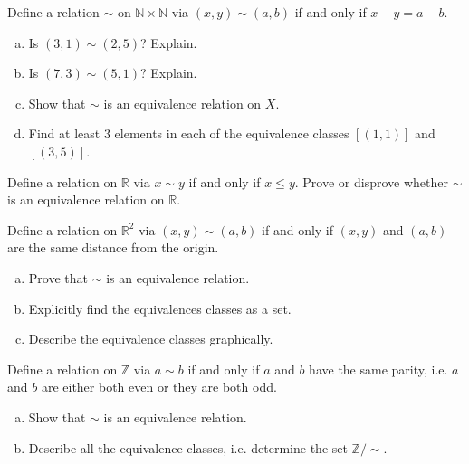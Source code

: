 \documentclass[11pt,letterpaper]{article}
\begin{document}
\homework{}

 Define a relation $\sim$ on $\mathbb{N} \times \mathbb{N}$ via $(x, y) \sim (a, b)$ if and only if $x - y= a - b$.  
        \begin{enumerate}[(a)]
        \item Is $(3, 1) \sim (2, 5)$? Explain.
        \item Is $(7, 3) \sim (5, 1)$? Explain. 
        \item Show that $\sim$ is an equivalence relation on $X$.
        \item Find at least 3 elements in each of the equivalence classes $[(1, 1)]$ and $[(3, 5)]$. 
        \end{enumerate} \pspace





\newpage





  Define a relation on $\mathbb{R}$ via $x \sim y$ if and only if $x \leq y$. Prove or disprove whether $\sim$ is an equivalence relation on $\mathbb{R}$. \pspace





\newpage





 Define a relation on $\mathbb{R}^2$ via $(x, y) \sim (a, b)$ if and only if $(x, y)$ and $(a, b)$ are the same distance from the origin. 
	\begin{enumerate}[(a)]
	\item Prove that $\sim$ is an equivalence relation.
	\item Explicitly find the equivalences classes as a set. 
	\item Describe the equivalence classes graphically. 
	\end{enumerate}





\newpage





 Define a relation on $\mathbb{Z}$ via $a \sim b$ if and only if $a$ and $b$ have the same parity, i.e. $a$ and $b$ are either both even or they are both odd. 
        \begin{enumerate}[(a)]
        \item Show that $\sim$ is an equivalence relation. 
        \item Describe all the equivalence classes, i.e. determine the set $\mathbb{Z}/\sim$. 
        \end{enumerate} \pspace
\end{document}

